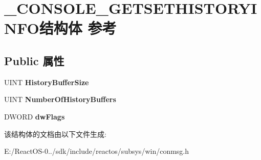 \hypertarget{struct___c_o_n_s_o_l_e___g_e_t_s_e_t_h_i_s_t_o_r_y_i_n_f_o}{}\section{\+\_\+\+C\+O\+N\+S\+O\+L\+E\+\_\+\+G\+E\+T\+S\+E\+T\+H\+I\+S\+T\+O\+R\+Y\+I\+N\+F\+O结构体 参考}
\label{struct___c_o_n_s_o_l_e___g_e_t_s_e_t_h_i_s_t_o_r_y_i_n_f_o}
\subsection*{Public 属性}
\begin{DoxyCompactItemize}
\item 
\mbox{\label{struct___c_o_n_s_o_l_e___g_e_t_s_e_t_h_i_s_t_o_r_y_i_n_f_o_ab053f3a45dd55b94298ccf788ab2d7bf}} 
U\+I\+NT {\bfseries History\+Buffer\+Size}
\item 
\mbox{\label{struct___c_o_n_s_o_l_e___g_e_t_s_e_t_h_i_s_t_o_r_y_i_n_f_o_ac5784e58792bb323d775253af93524cb}} 
U\+I\+NT {\bfseries Number\+Of\+History\+Buffers}
\item 
\mbox{\label{struct___c_o_n_s_o_l_e___g_e_t_s_e_t_h_i_s_t_o_r_y_i_n_f_o_ac6af88e763deed6d2d33458ce91c9101}} 
D\+W\+O\+RD {\bfseries dw\+Flags}
\end{DoxyCompactItemize}


该结构体的文档由以下文件生成\+:\begin{DoxyCompactItemize}
\item 
E\+:/\+React\+O\+S-\/0../sdk/include/reactos/subsys/win/conmsg.\+h\end{DoxyCompactItemize}
